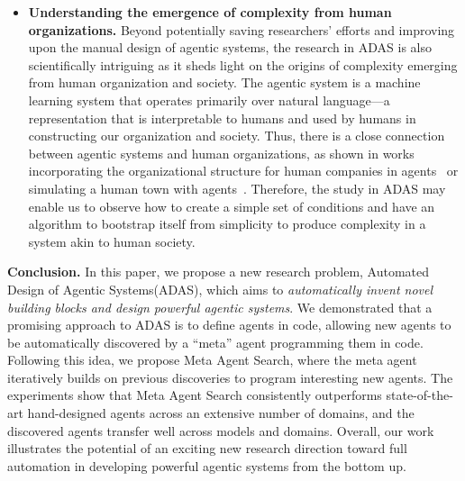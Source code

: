 \documentclass{article} %
\newcommand{\problemlong}{Automated Design of Agentic Systems\xspace}
\newcommand{\problem}{ADAS\xspace}
\newcommand{\ouralgo}{Meta Agent Search\xspace}
\begin{document}
\begin{itemize}[label=\large\textbullet, left=0pt]
\item \noindent\textbf{Understanding the emergence of complexity from human organizations.}\hspace{0.3em} Beyond potentially saving researchers' efforts and improving upon the manual design of agentic systems, the research in \problem is also scientifically intriguing as it sheds light on the origins of complexity emerging from human organization and society. The agentic system is a machine learning system that operates primarily over natural language—a representation that is interpretable to humans and used by humans in constructing our organization and society. Thus, there is a close connection between agentic systems and human organizations, as shown in works incorporating the organizational structure for human companies in agents~\citep{hong2023metagpt} or simulating a human town with agents~\citep{park2023generative}. Therefore, the study in \problem may enable us to observe how to create a simple set of conditions and have an algorithm to bootstrap itself from simplicity to produce complexity in a system akin to human society.

\end{itemize}


\noindent\textbf{Conclusion.}\hspace{0.5em} In this paper, we propose a new research problem, \problemlong (\problem), which aims to \emph{automatically invent novel building blocks and design powerful agentic systems}. We demonstrated that a promising approach to \problem is to define agents in code, allowing new agents to be automatically discovered by a ``meta'' agent programming them in code. Following this idea, we propose \ouralgo, where the meta agent iteratively builds on previous discoveries to program interesting new agents. The experiments show that \ouralgo consistently outperforms state-of-the-art hand-designed agents across an extensive number of domains, and the discovered agents transfer well across models and domains. Overall, our work illustrates the potential of an exciting new research direction toward full automation in developing powerful agentic systems from the bottom up.

\end{document}
